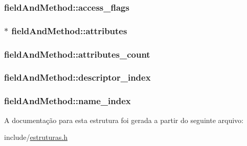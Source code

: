 \subsubsection[{\texorpdfstring{access\+\_\+flags}{access_flags}}]{ field\+And\+Method\+::access\+\_\+flags}\hypertarget{structfield_and_method_a04b1604b7553b064887cc578d441d7aa}{}\label{structfield_and_method_a04b1604b7553b064887cc578d441d7aa}
\subsubsection[{\texorpdfstring{attributes}{attributes}}]{$\ast$ field\+And\+Method\+::attributes}\hypertarget{structfield_and_method_ad7062d512c3653c46dfa1fb6acf07396}{}\label{structfield_and_method_ad7062d512c3653c46dfa1fb6acf07396}
\subsubsection[{\texorpdfstring{attributes\+\_\+count}{attributes_count}}]{ field\+And\+Method\+::attributes\+\_\+count}\hypertarget{structfield_and_method_a0b45411cd7a3167fdcfad1af18a799e5}{}\label{structfield_and_method_a0b45411cd7a3167fdcfad1af18a799e5}
\subsubsection[{\texorpdfstring{descriptor\+\_\+index}{descriptor_index}}]{ field\+And\+Method\+::descriptor\+\_\+index}\hypertarget{structfield_and_method_a61c33b04e96966edbfd142eea9992834}{}\label{structfield_and_method_a61c33b04e96966edbfd142eea9992834}
\subsubsection[{\texorpdfstring{name\+\_\+index}{name_index}}]{ field\+And\+Method\+::name\+\_\+index}\hypertarget{structfield_and_method_ac636d7076db5a2ce9891613be8ad9b00}{}\label{structfield_and_method_ac636d7076db5a2ce9891613be8ad9b00}


A documentação para esta estrutura foi gerada a partir do seguinte arquivo\+:\begin{DoxyCompactItemize}
\item 
include/\hyperlink{estruturas_8h}{estruturas.\+h}\end{DoxyCompactItemize}
